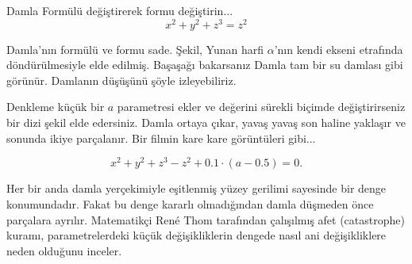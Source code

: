 \begin{surferPage}{Damla}
Formülü değiştirerek formu değiştirin...\\

\smallskip
\[x^2	+ y^2	+ z^3	= z^2\]

\singlespacing
Damla'nın formülü ve formu sade. Şekil,  Yunan harfi $\alpha$'nın kendi ekseni etrafında döndürülmesiyle elde edilmiş. Başaşağı bakarsanız Damla tam bir su damlası gibi görünür. Damlanın düşüşünü şöyle izleyebiliriz.
\newline

Denkleme küçük bir  $a$ parametresi ekler ve değerini sürekli biçimde değiştirirseniz bir dizi şekil elde edersiniz. Damla ortaya çıkar, yavaş yavaş son haline yaklaşır ve sonunda ikiye parçalanır.  Bir filmin kare kare görüntüleri gibi...

\[x^2	+ y^2	+ z^3	-z^2+0.1\cdot (a-0.5)=0.\]

Her bir anda damla yerçekimiyle eşitlenmiş yüzey gerilimi sayesinde bir denge konumundadır.
Fakat bu denge  kararlı olmadığından damla düşmeden önce  parçalara ayrılır. Matematikçi Ren\'e Thom tarafından çalışılmış afet (catastrophe) kuramı, parametrelerdeki küçük değişikliklerin dengede nasıl ani değişikliklere neden olduğunu inceler.
\end{surferPage}
